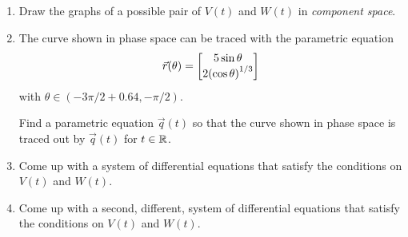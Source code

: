 \begin{enumerate}
		\begin{enumerate}
			\item Draw the graphs of a possible pair of $V(t)$ and $W(t)$ in \emph{component space}.
			\item The curve shown in phase space can be traced with the parametric equation \[\vec r(\theta)=\begin{bmatrix}5\sin\theta \\ 2{(\cos\theta)}^{1/3}\end{bmatrix}\]
			with $\theta\in(-3\pi/2 + 0.64, -\pi/2)$.

			Find a parametric equation $\vec q(t)$ so that the curve shown in phase space is traced out by $\vec q(t)$ for $t\in \mathbb{R}$.

			\item Come up with a system of differential equations that satisfy the conditions on $V(t)$ and $W(t)$.

			\item Come up with a second, different, system of differential equations that satisfy the conditions on $V(t)$ and $W(t)$.
		\end{enumerate}






\end{enumerate}
